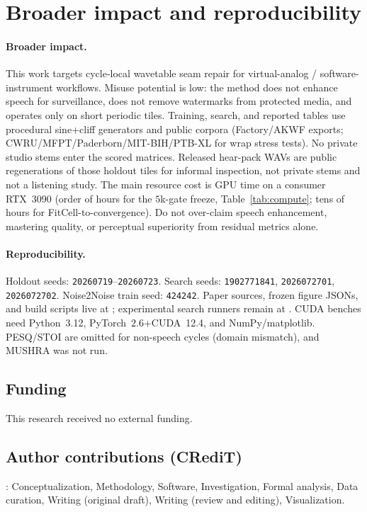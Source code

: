 \section{Broader impact and reproducibility}
\label{sec:ethics}

\paragraph{Broader impact.}
This work targets cycle-local wavetable seam repair for virtual-analog / software-instrument workflows.
Misuse potential is low: the method does not enhance speech for surveillance, does not remove watermarks from protected media, and operates only on short periodic tiles.
Training, search, and reported tables use procedural sine{+}cliff generators and public corpora (Factory/AKWF exports; CWRU/MFPT/Paderborn/MIT-BIH/PTB-XL for wrap stress tests).
No private studio stems enter the scored matrices.
Released hear-pack WAVs are public regenerations of those holdout tiles for informal inspection, not private stems and not a listening study.
The main resource cost is GPU time on a consumer RTX~3090 (order of hours for the $5$k-gate freeze, Table~\ref{tab:compute}; tens of hours for FitCell-to-convergence).
Do not over-claim speech enhancement, mastering quality, or perceptual superiority from residual metrics alone.

\paragraph{Reproducibility.}
Holdout seeds: \texttt{20260719}--\texttt{20260723}.
Search seeds: \texttt{1902771841}, \texttt{2026072701}, \texttt{2026072702}.
Noise2Noise train seed: \texttt{424242}.
Paper sources, frozen figure JSONs, and build scripts live at
;
experimental search runners remain at .
CUDA benches need Python~3.12, PyTorch~$2.6$+CUDA~12.4, and NumPy/matplotlib.
PESQ/STOI are omitted for non-speech cycles (domain mismatch), and MUSHRA was not run.

\subsection{Funding}
\label{sec:funding}
This research received no external funding.

\subsection{Author contributions (CRediT)}
\label{sec:credit}
\authorname{}: Conceptualization, Methodology, Software, Investigation, Formal analysis, Data curation, Writing (original draft), Writing (review and editing), Visualization.


